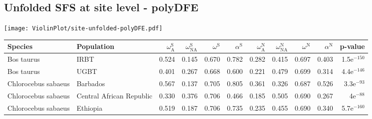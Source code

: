\subsection{Unfolded SFS at site level - polyDFE} 
\begin{center}
\texttt{[image: ViolinPlot/site-unfolded-polyDFE.pdf]} 
\begin{adjustbox}{width = 1\textwidth}
\begin{tabular}{llrrrrrrrrr}
\toprule
             Species &                Population & $\omega_{\textrm{A}}^{\textrm{S}}$ & $\omega_{\textrm{NA}}^{\textrm{S}}$ & $\omega^{\textrm{S}}$ & $\alpha^{\textrm{S}}$ & $\omega_{\textrm{A}}^{\textrm{N}}$ & $\omega_{\textrm{NA}}^{\textrm{N}}$ & $\omega^{\textrm{N}}$ & $\alpha^{\textrm{N}}$ &       p-value \\
\midrule
          Bos taurus &                      IRBT &                              0.524 &                               0.145 &                 0.670 &                 0.782 &                              0.282 &                               0.415 &                 0.697 &                 0.403 & 1.5e$^{-150}$ \\
          Bos taurus &                      UGBT &                              0.401 &                               0.267 &                 0.668 &                 0.600 &                              0.221 &                               0.479 &                 0.699 &                 0.314 & 4.4e$^{-146}$ \\
 Chlorocebus sabaeus &                  Barbados &                              0.567 &                               0.137 &                 0.705 &                 0.805 &                              0.361 &                               0.326 &                 0.687 &                 0.526 &  3.3e$^{-93}$ \\
 Chlorocebus sabaeus &  Central African Republic &                              0.330 &                               0.376 &                 0.706 &                 0.466 &                              0.185 &                               0.505 &                 0.690 &                 0.267 &    4e$^{-88}$ \\
 Chlorocebus sabaeus &                  Ethiopia &                              0.519 &                               0.187 &                 0.706 &                 0.735 &                              0.235 &                               0.455 &                 0.690 &                 0.340 & 5.7e$^{-160}$ \\

\end{tabular}
\end{adjustbox}
\end{center}
